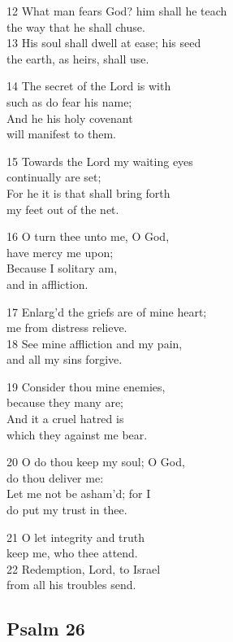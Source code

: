 \begin{multicols}{3}
12 What man fears God? him shall he teach\\
the way that he shall chuse.\\
13 His soul shall dwell at ease; his seed\\
the earth, as heirs, shall use.

14 The secret of the Lord is with\\
such as do fear his name;\\
And he his holy covenant\\
will manifest to them.

15 Towards the Lord my waiting eyes\\
continually are set;\\
For he it is that shall bring forth\\
my feet out of the net.

16 O turn thee unto me, O God,\\
have mercy me upon;\\
Because I solitary am,\\
and in affliction.

17 Enlarg’d the griefs are of mine heart;\\
me from distress relieve.\\
18 See mine affliction and my pain,\\
and all my sins forgive.

19 Consider thou mine enemies,\\
because they many are;\\
And it a cruel hatred is\\
which they against me bear.

20 O do thou keep my soul; O God,\\
do thou deliver me:\\
Let me not be asham’d; for I\\
do put my trust in thee.

21 O let integrity and truth\\
keep me, who thee attend.\\
22 Redemption, Lord, to Israel\\
from all his troubles send.

\begin{center}
\quad{}\quad{}
\end{center}

\subsection*{Psalm 26 }


\end{multicols}
